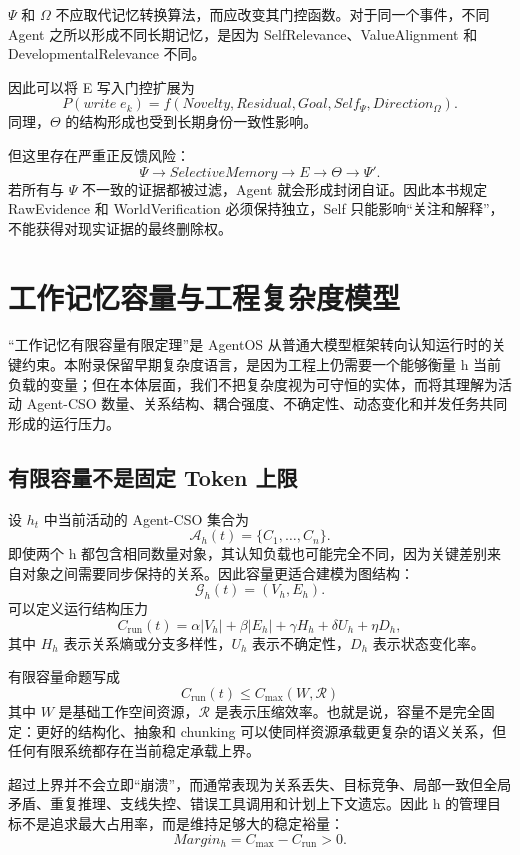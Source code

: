 $\Psi$ 和 $\Omega$ 不应取代记忆转换算法，而应改变其门控函数。对于同一个事件，不同 Agent 之所以形成不同长期记忆，是因为 SelfRelevance、ValueAlignment 和 DevelopmentalRelevance 不同。

因此可以将 E 写入门控扩展为
\[
P(write\;e_k)
=
f(
Novelty,
Residual,
Goal,
Self_\Psi,
Direction_\Omega
).
\]
同理，$\Theta$ 的结构形成也受到长期身份一致性影响。

但这里存在严重正反馈风险：
\[
\Psi
\rightarrow
SelectiveMemory
\rightarrow
E
\rightarrow
\Theta
\rightarrow
\Psi'.
\]
若所有与 $\Psi$ 不一致的证据都被过滤，Agent 就会形成封闭自证。因此本书规定 RawEvidence 和 WorldVerification 必须保持独立，Self 只能影响“关注和解释”，不能获得对现实证据的最终删除权。


\chapter{工作记忆容量与工程复杂度模型}
\label{app:capacity}

\begin{chapterlead}
“工作记忆有限容量有限定理”是 AgentOS 从普通大模型框架转向认知运行时的关键约束。本附录保留早期复杂度语言，是因为工程上仍需要一个能够衡量 h 当前负载的变量；但在本体层面，我们不把复杂度视为可守恒的实体，而将其理解为活动 Agent-CSO 数量、关系结构、耦合强度、不确定性、动态变化和并发任务共同形成的运行压力。
\end{chapterlead}

\section{有限容量不是固定 Token 上限}

设 $h_t$ 中当前活动的 Agent-CSO 集合为
\[
\mathcal A_h(t)=\{C_1,\ldots,C_n\}.
\]
即使两个 h 都包含相同数量对象，其认知负载也可能完全不同，因为关键差别来自对象之间需要同步保持的关系。因此容量更适合建模为图结构：
\[
\mathcal G_h(t)
=
(V_h,E_h).
\]
可以定义运行结构压力
\[
C_{\mathrm{run}}(t)
=
\alpha |V_h|
+
\beta |E_h|
+
\gamma H_h
+
\delta U_h
+
\eta D_h,
\]
其中 $H_h$ 表示关系熵或分支多样性，$U_h$ 表示不确定性，$D_h$ 表示状态变化率。

有限容量命题写成
\[
\boxed{
C_{\mathrm{run}}(t)
\le
C_{\max}(W,\mathcal R)
}
\]
其中 $W$ 是基础工作空间资源，$\mathcal R$ 是表示压缩效率。也就是说，容量不是完全固定：更好的结构化、抽象和 chunking 可以使同样资源承载更复杂的语义关系，但任何有限系统都存在当前稳定承载上界。

超过上界并不会立即“崩溃”，而通常表现为关系丢失、目标竞争、局部一致但全局矛盾、重复推理、支线失控、错误工具调用和计划上下文遗忘。因此 h 的管理目标不是追求最大占用率，而是维持足够大的稳定裕量：
\[
Margin_h
=
C_{\max}-C_{\mathrm{run}}>0.
\]

